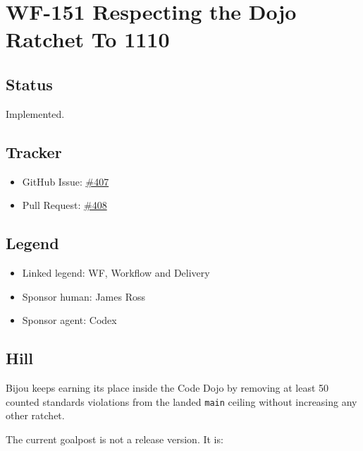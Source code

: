 \chapter{WF-151 Respecting the Dojo Ratchet To 1110}\label{record-233}

\smallskip

\section{Status}\label{record-233-status}

Implemented.

\section{Tracker}\label{record-233-tracker}

\begin{itemize}
\tightlist
\item
  GitHub Issue: \href{https://github.com/flyingrobots/bijou/issues/407}{\#407}
\item
  Pull Request: \href{https://github.com/flyingrobots/bijou/pull/408}{\#408}
\end{itemize}

\section{Legend}\label{record-233-legend}

\begin{itemize}
\tightlist
\item
  Linked legend: WF, Workflow and Delivery
\item
  Sponsor human: James Ross
\item
  Sponsor agent: Codex
\end{itemize}

\section{Hill}\label{record-233-hill}

Bijou keeps earning its place inside the Code Dojo by removing at least 50 counted standards violations from the landed \texttt{m\allowbreak{}a\allowbreak{}i\allowbreak{}n} ceiling without increasing any other ratchet.

The current goalpost is not a release version. It is:

